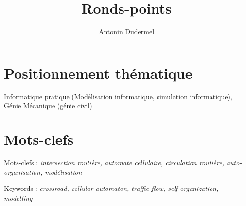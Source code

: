 \documentclass[11pt,a4paper,french]{article}
\title{Ronds-points}
\date{}
\author{Antonin Dudermel}
\begin{document}

\maketitle

\section*{Positionnement thématique}
Informatique pratique (Modélisation informatique, simulation informatique), Génie Mécanique (génie civil)

\section*{Mots-clefs}
Mots-clefs : {\it intersection routière, automate cellulaire, circulation routière, auto-organisation, modélisation} \par
Keywords : {\it crossroad, cellular automaton, traffic flow, self-organization, modelling}
\end{document}
